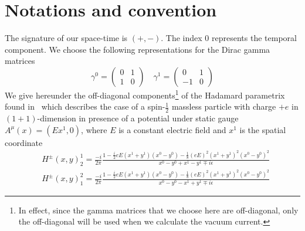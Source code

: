 \section*{Notations and convention}
The signature of our space-time is $(+, -)$.
The index 0 represents the temporal component.
We choose the following representations for the Dirac gamma matrices
\begin{equation*}
\gamma^0 = \begin{pmatrix}
0 & 1 \\
1 & 0 \end{pmatrix}  \quad  \gamma^1 = \begin{pmatrix}
0  & 1 \\
-1 & 0
\end{pmatrix}
\end{equation*}
We give hereunder the off-diagonal components\footnote{
In effect, since the gamma matrices that we choose here are off-diagonal, only the off-diagonal will be used when we calculate the vacuum current.
}
 of the Hadamard parametrix found in~\cite{Zahn2015} which describes the case of a spin-$\frac 1 2$ massless particle with charge $+e$ in $(1+1)$-dimension in presence of a potential under static gauge $A^\mu(x) = (Ex^1, 0)$, where $E$ is a constant electric field and $x^1$ is the spatial coordinate
\begin{equation}\label{vacuum-hadamardparametrix}
\begin{split}
& H^\pm (x, y)^1_2 = \frac{-i}{2\pi}\frac{1-\frac i 2 e E(x^1 + y^1)(x^0-y^0) 
- \frac 1 8 (eE)^2(x^1 + y^1)^2(x^0 - y^0)^2}{x^0 - y^0 + x^1 - y^1 \mp i \epsilon}  \\
& H^\pm (x, y)^2_1 = \frac{-i}{2\pi}\frac{1-\frac i 2 e E(x^1 + y^1)(x^0-y^0) 
- \frac 1 8 (eE)^2(x^1 + y^1)^2(x^0 - y^0)^2}{x^0 - y^0 - x^1 + y^1 \mp i \epsilon}
\end{split}
\end{equation}
%
